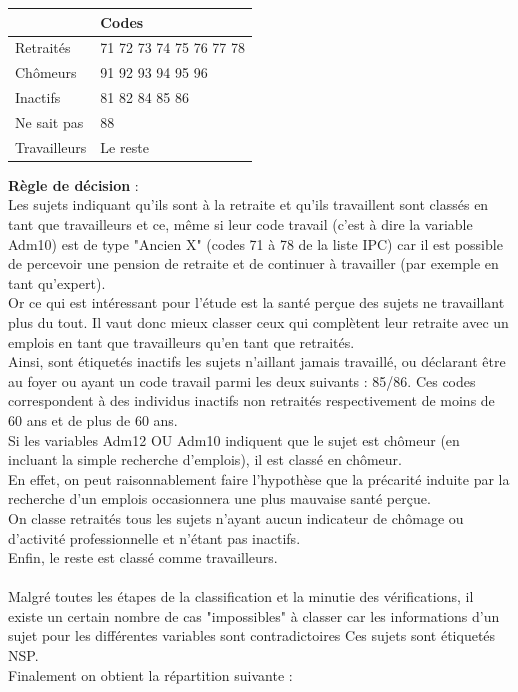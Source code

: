 \documentclass{book}
\begin{document}
\begin{center}
\begin{tabular}{l|l}
 & Codes \\
 \hline
Retraités & 71 72 73 74 75 76 77 78\\
Chômeurs & 91 92 93 94 95 96\\
Inactifs & 81 82 84 85 86\\
Ne sait pas & 88\\
Travailleurs & Le reste
\end{tabular}
\end{center}

\newpage
\noindent
\textbf{Règle de décision} : \\
\noindent
Les sujets indiquant qu'ils sont à la retraite et qu'ils travaillent sont classés en tant que travailleurs et ce, même si leur code travail (c'est à dire la variable Adm10) est de type "Ancien X" (codes 71 à 78 de la liste IPC) car il est possible de percevoir une pension de retraite et de continuer à travailler (par exemple en tant qu'expert). \\
\noindent
Or ce qui est intéressant pour l'étude est la santé perçue des sujets ne travaillant plus du tout. Il vaut donc mieux classer ceux qui complètent leur retraite avec un emplois en tant que travailleurs qu'en tant que retraités.\\
\noindent
Ainsi, sont étiquetés inactifs les sujets n'aillant jamais travaillé, ou déclarant être au foyer ou ayant un code travail parmi les deux suivants : 85/86. Ces codes correspondent à des individus inactifs non retraités respectivement de moins de 60 ans et de plus de 60 ans.\\
\noindent
Si les variables Adm12 OU Adm10 indiquent que le sujet est chômeur (en incluant la simple recherche d'emplois), il est classé en chômeur.\\
\noindent
En effet, on peut raisonnablement faire l'hypothèse que la précarité induite par la recherche d'un emplois occasionnera une plus mauvaise santé perçue.\\
\noindent
On classe retraités tous les sujets n'ayant aucun indicateur de chômage ou d'activité professionnelle et n'étant pas inactifs.\\
\noindent
Enfin, le reste est classé comme travailleurs.\\\\
\noindent
Malgré toutes les étapes de la classification et la minutie des vérifications, il  existe un certain nombre de cas "impossibles" à classer car les informations d'un sujet pour les différentes variables sont contradictoires Ces sujets sont étiquetés NSP.\\
\noindent
Finalement on obtient la répartition suivante : \\
\end{document}
